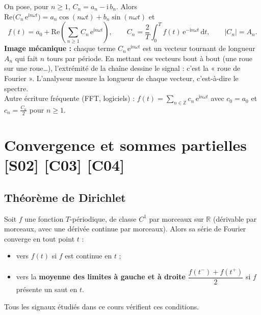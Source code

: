 \documentclass[a4paper,11pt]{article}
\begin{document}
\begin{horsprog}\label{hp:complexe}
On pose, pour $n\geq 1$, $C_n = a_n - \mathrm i\,b_n$. Alors $\mathrm{Re}\big(C_n\,\mathrm e^{\mathrm i n\omega t}\big) = a_n\cos(n\omega t) + b_n\sin(n\omega t)$ et
\[
f(t) = a_0 + \mathrm{Re}\left(\sum_{n\geq 1} C_n\,\mathrm e^{\mathrm i n\omega t}\right),
\qquad
C_n = \frac2T\int_0^T f(t)\,\mathrm e^{-\mathrm i n\omega t}\,\mathrm dt,
\qquad
|C_n| = A_n.
\]
\textbf{Image mécanique :} chaque terme $C_n\,\mathrm e^{\mathrm i n\omega t}$ est un vecteur tournant de longueur $A_n$ qui fait $n$ tours par période. En mettant ces vecteurs bout à bout (une roue sur une roue\dots), l'extrémité de la chaîne dessine le signal : c'est la « roue de Fourier ». L'analyseur mesure la longueur de chaque vecteur, c'est-à-dire le spectre.\\
Autre écriture fréquente (FFT, logiciels) : $f(t) = \sum_{n\in\mathbb Z} c_n\,\mathrm e^{\mathrm i n\omega t}$ avec $c_0 = a_0$ et $c_n = \frac{C_n}{2}$ pour $n\geq 1$.
\end{horsprog}

\needspace{7cm}
\section{Convergence et sommes partielles \hfill {\normalsize\color{uimmred}[S02] [C03] [C04]}}\label{sec:convergence}

\subsection{Théorème de Dirichlet}\label{subsec:dirichlet}

\begin{theoreme}\label{th:dirichlet}
Soit $f$ une fonction $T$-périodique, de classe $C^1$ par morceaux sur $\mathbb{R}$ (dérivable par morceaux, avec une dérivée continue par morceaux). Alors sa série de Fourier converge en tout point $t$ :
\begin{itemize}
  \item vers $f(t)$ si $f$ est continue en $t$ ;
  \item vers la \textbf{moyenne des limites à gauche et à droite} $\dfrac{f(t^-) + f(t^+)}{2}$ si $f$ présente un saut en $t$.
\end{itemize}
Tous les signaux étudiés dans ce cours vérifient ces conditions.
\end{theoreme}
\end{document}

